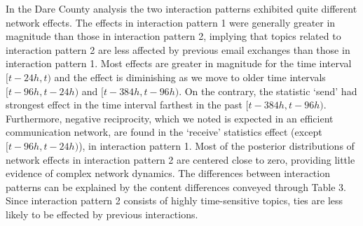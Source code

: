 \documentclass[a4paper]{article}
\begin{document}
          	In the Dare County analysis the two interaction patterns exhibited quite different network effects. The effects in interaction pattern 1 were generally greater in magnitude than those in interaction pattern 2, implying that topics related to interaction pattern 2 are less affected by previous email exchanges than those in interaction pattern 1. Most effects are greater in magnitude for the time interval $[t-24h, t)$ and the effect is diminishing as we move to older time intervals $[t-96h, t-24h)$ and $[t-384h, t-96h)$. On the contrary, the statistic `send' had strongest effect in the time interval farthest in the past $[t-384h, t-96h)$. Furthermore, negative reciprocity, which we noted is expected in an efficient communication network, are found in the `receive' statistics effect (except $[t-96h, t-24h)$), in interaction pattern 1.  Most of the posterior distributions of network effects in interaction pattern 2 are centered close to zero, providing little evidence of complex network dynamics. The differences between interaction patterns can be explained by the content differences conveyed through Table 3. Since interaction pattern 2 consists of highly time-sensitive topics, ties are less likely to be effected by previous interactions.
\end{document}

